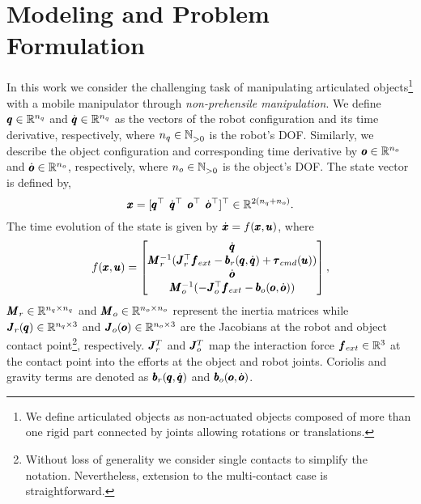\section{Modeling and Problem Formulation} \label{sec:formulation}

In this work we consider the challenging task of manipulating articulated objects\footnote{We define articulated objects as non-actuated objects composed of more than one rigid part connected by joints allowing rotations or translations.} with a mobile manipulator through \textit{non-prehensile manipulation}. We define $\pmb{q} \in \mathbb{R}^{n_q}$ and $\dot{\pmb{q}} \in \mathbb{R}^{n_q}$ as the vectors of the robot configuration and its time derivative, respectively, where $n_q \in \mathbb{N}^{}_{>0}$ is the robot's DOF.
Similarly, we describe the object configuration and corresponding time derivative by $\pmb{o} \in \mathbb{R}^{n_o}$ and $\dot{\pmb{o}} \in \mathbb{R}^{n_o}$, respectively, where $n_o \in \mathbb{N}^{}_{>0}$ is the object's DOF. The state vector is defined by,
\begin{equation}
    \pmb{x} = [\pmb{q}^\top \;\, 
      \dot{\pmb{q}}^\top \;\, 
      \pmb{o}^\top \;\,
      \dot{\pmb{o}}^\top ]^\top  \in \mathbb{R}^{2(n_q + n_o)}.
\end{equation}
The time evolution of the state is given by $\dot{\pmb{x}} = f(\pmb{x}, \pmb{u})$, where
\begin{equation} \label{eq:eom}
    f(\pmb{x}, \pmb{u}) =  
    \begin{bmatrix}
      \dot{\pmb{q}} \\
      \pmb{M}_r^{-1}(\pmb{J}_{r}^\top \pmb{f}_{ext} - \pmb{b}_{r}(\pmb{q}, \dot{\pmb{q}}) + \pmb{\tau}_{cmd}(\pmb{u})) \\
      \dot{\pmb{o}} \\
      \pmb{M}_o^{-1}(-\pmb{J}_{o}^\top \pmb{f}_{ext} - \pmb{b}_{o}(\pmb{o}, \dot{\pmb{o}}))
    \end{bmatrix},
\end{equation}
$\pmb{M}_r \in \mathbb{R}^{n_q \times n_q}$ and $\pmb{M}_o \in \mathbb{R}^{n_o \times n_o}$ represent the inertia matrices while $\pmb{J}_r(\pmb{q}) \in \mathbb{R}^{n_q \times 3}$ and $\pmb{J}_o(\pmb{o}) \in \mathbb{R}^{n_o \times 3}$ are the Jacobians at the robot and object contact point\footnote{Without loss of generality we consider single contacts to simplify the notation. Nevertheless, extension to the multi-contact case is straightforward.}, respectively.
$\pmb{J}^T_r$ and $\pmb{J}^T_o$ map the interaction force $\pmb{f}_{ext} \in \mathbb{R}^{3}$ at the contact point into the efforts at the object and robot joints. Coriolis and gravity terms are denoted as $\pmb{b}_{r}(\pmb{q}, \dot{\pmb{q}})$ and $\pmb{b}_{o}(\pmb{o}, \dot{\pmb{o}})$. 

